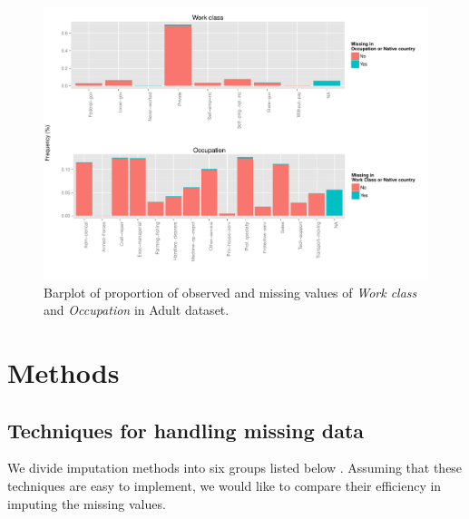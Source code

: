 \documentclass[12pt]{article}
\begin{document}
\begin{figure}[htbp] 
   \centering
   \includegraphics[scale=.6]{barplot-missing.pdf} 
   \caption{Barplot of proportion of observed and missing values of \textit{Work class} and \textit{Occupation} in Adult dataset.}
   \label{barplot-missing}
\end{figure}

\section{Methods}


\subsection{Techniques for handling missing data}
We divide imputation methods into six groups listed
below \citep{batista2003analysis}. Assuming that these techniques are easy to
implement, we would like to compare their efficiency in imputing the missing
values.
\end{document}
